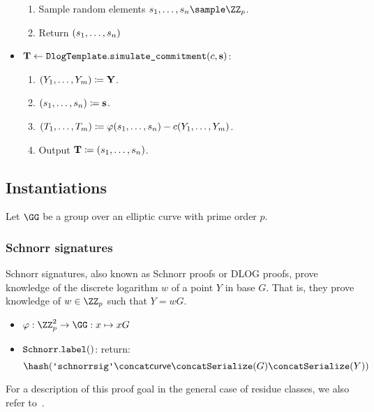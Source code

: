 \documentclass[11pt]{article}
\begin{document}
\begin{itemize}
  \begin{enumerate}
    \item Sample random elements $\response_1,\dots,\response_n\sample\ZZ_p$.
    \item Return $(s_1, \dots, s_n)$
  \end{enumerate}
  \item\label{item:basic:sim}
     $\mathbf {T} \gets \texttt{DlogTemplate}.\texttt{simulate\_commitment}(c, \mathbf s)$:
    \begin{enumerate}
      \item
       $(Y_1,\dots,Y_m)\coloneqq \mathbf {Y}$.
      \item\label{item:basic:sim:s}
       $(s_1,\dots,s_n) \coloneqq \mathbf {s}$.
      \item
         $(T_1,\dots,T_m) \coloneqq \varphi(s_1,\dots,s_n) - c(Y_1,\dots,Y_m)$.
      \item
        Output $\mathbf {T} \coloneqq(s_1,\dots,s_n)$.
    \end{enumerate}
\end{itemize}

\subsection{Instantiations}
Let $\GG$ be a group over an elliptic curve with prime order $p$.

\subsubsection{Schnorr signatures}
Schnorr signatures, also known as Schnorr proofs or DLOG proofs, prove knowledge of the discrete logarithm $w$ of a point $Y$ in base $G$.
That is, they prove knowledge of $w\in\ZZ_p$ such that $Y=wG$.

\begin{itemize}
  \item $\varphi:\ZZ_p^2\to\GG:x\mapsto xG$
  \item $\texttt{Schnorr}.\texttt{label}()$: return:
  \[
    \hash(\schnorrlabel \concat \curvectx \concat \serialize(G) \concat \serialize(Y))
  \]
\end{itemize}

For a description of this proof goal in the general case of residue classes, we also refer to~\cite[1.4.1]{zkproof-reference}.
\end{document}
